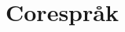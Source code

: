 \documentclass[Rapport]{subfiles}
\begin{document}
\section{Corespråk}



% 








\end{document}
